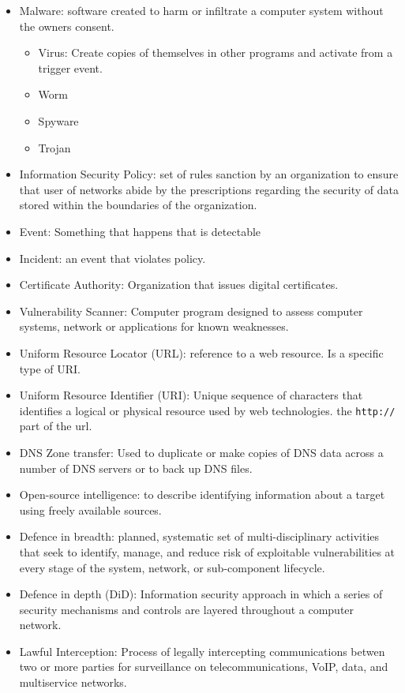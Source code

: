 \begin{itemize}
	\item Malware: software created to harm or infiltrate a computer system without the owners consent.
	\begin{itemize}
        \item Virus: Create copies of themselves in other programs and activate from a trigger event.
        \item Worm
        \item Spyware
        \item Trojan
    \end{itemize}
    \item Information Security Policy: set of rules sanction by an organization to ensure that user of networks abide by the prescriptions regarding the security of data stored within the boundaries of the organization.
    \item Event: Something that happens that is detectable
    \item Incident: an event that violates policy.
    \item Certificate Authority: Organization that issues digital certificates.
    \item Vulnerability Scanner: Computer program designed to assess computer systems, network or applications for known weaknesses.
    \item Uniform Resource Locator (URL): reference to a web resource. Is a specific type of URI.
    \item Uniform Resource Identifier (URI): Unique sequence of characters that identifies a logical or physical resource used by web technologies. the \verb|http://| part of the url.
    \item DNS Zone transfer: Used to duplicate or make copies of DNS data across a number of DNS servers or to back up DNS files.
    \item Open-source intelligence: to describe identifying information about a target using freely available sources.
    \item Defence in breadth: planned, systematic set of multi-disciplinary activities that seek to identify, manage, and reduce risk of exploitable vulnerabilities at every stage of the system, network, or sub-component lifecycle.
    \item Defence in depth (DiD): Information security approach in which a series of security mechanisms and controls are layered throughout a computer network.
    \item Lawful Interception: Process of legally intercepting communications betwen two or more parties for surveillance on telecommunications, VoIP, data, and multiservice networks.

\end{itemize}
